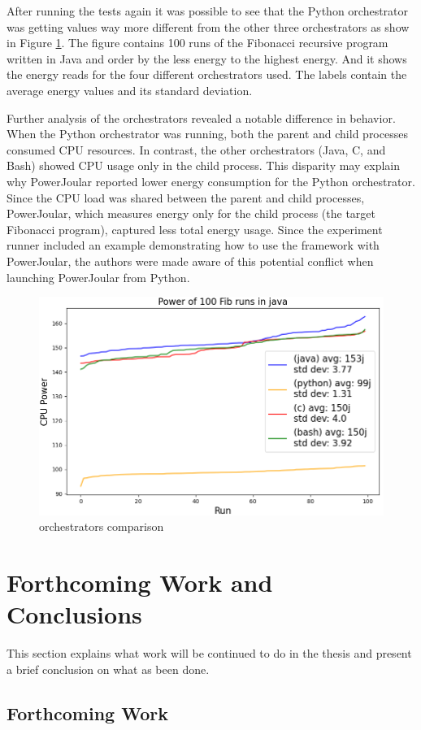 \documentclass[sigplan]{acmart}
\begin{document}
After running the tests again it was possible to see that the Python orchestrator was getting values way more different from the other three orchestrators as show in Figure \ref{fig:4_orchs_comparison}.
The figure contains 100 runs of the Fibonacci recursive program written in Java and order by the less energy to the highest energy. And it shows the energy reads for the four different orchestrators used. The labels contain the average energy values and its standard deviation.

Further analysis of the orchestrators revealed a notable difference in behavior. When the Python orchestrator was running, both the parent and child processes consumed CPU resources. In contrast, the other orchestrators (Java, C, and Bash) showed CPU usage only in the child process. This disparity may explain why PowerJoular reported lower energy consumption for the Python orchestrator. Since the CPU load was shared between the parent and child processes, PowerJoular, which measures energy only for the child process (the target Fibonacci program), captured less total energy usage.
Since the experiment runner included an example demonstrating how to use the framework with PowerJoular, the authors were made aware of this potential conflict when launching PowerJoular from Python.

\begin{figure}%
  \centering
  \includegraphics[width = 0.5 \textwidth]{figures/4_orchestrators_comparison.png}
  \caption{orchestrators comparison}
  \label{fig:4_orchs_comparison}
\end{figure}

\section{Forthcoming Work and Conclusions} \label{sec:forthcoming_work_and_conclusions}

This section explains what work will be continued to do in the thesis and present a brief conclusion on what as been done.

\subsection{Forthcoming Work}
\end{document}
